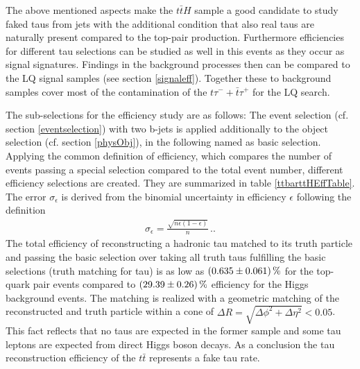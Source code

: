 %
The above mentioned aspects make the $t\bar{t}H$ sample a good candidate to study faked taus from jets with the additional condition that also real taus are naturally present compared to the top-pair production. Furthermore efficiencies for different tau selections can be studied as well in this events as they occur as signal signatures. Findings in the background processes then can be compared to the LQ signal samples (see section \ref{signaleff}). \newline
Together these to background samples cover most of the contamination of the $t\tau^{-}+\bar{t}\tau^{+}$ for the LQ search.\par
The sub-selections for the efficiency study are as follows: The event selection (cf. section \ref{eventselection}) with two b-jets is applied additionally to the object selection (cf. section \ref{physObj}), in the following named as basic selection. Applying the common definition of efficiency, which compares the number of events passing a special selection compared to the total event number, different efficiency selections are created. They are summarized in table \ref{ttbarttHEffTable}. The error $\sigma_\epsilon$ is derived from the binomial uncertainty in efficiency $\epsilon$ following the definition
\begin{align}
\sigma_\epsilon=\frac{\sqrt{n\epsilon\left(1-\epsilon\right)}}{n}\,\text{.}.
\label{binomialerror}
\end{align}
The total efficiency of reconstructing a hadronic tau matched to its truth particle and passing the basic selection over taking all truth taus fulfilling the basic selections (truth matching for tau) is as low as $\SI{0.635\pm 0.061}{\percent}$ for the top-quark pair events compared to $\SI{29.39\pm 0.26}{\percent}$ efficiency for the Higgs background events. The matching is realized with a geometric matching of the reconstructed and truth particle within a cone of $\Delta R=\sqrt{\Delta\phi^2+\Delta\eta^2}<0.05$. This fact reflects that no taus are expected in the former sample and some tau leptons are expected from direct Higgs boson decays. As a conclusion the tau reconstruction efficiency of the $t\bar{t}$ represents a fake tau rate.\par 
%	
